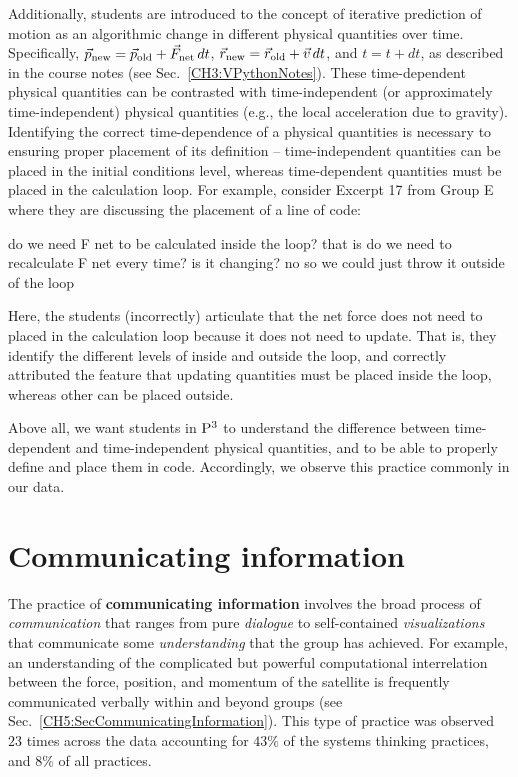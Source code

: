 \documentclass{msuphddissertation}
\begin{document}
\begin{doublespace}
\begin{appendices}
Additionally, students are introduced to the concept of iterative prediction of motion as an algorithmic change in different physical quantities over time.  Specifically, $\vec{p}_{\rm new} = \vec{p}_{\rm old} + \vec{F}_{\rm net}\,dt$, $\vec{r}_{\rm new} = \vec{r}_{\rm old} + \vec{v}\,dt$, and $t = t + dt$, as described in the course notes (see Sec.~\ref{CH3:VPythonNotes}).  These time-dependent physical quantities can be contrasted with time-independent (or approximately time-independent) physical quantities (e.g., the local acceleration due to gravity).  Identifying the correct time-dependence of a physical quantities is necessary to ensuring proper placement of its definition -- time-independent quantities can be placed in the initial conditions level, whereas time-dependent quantities must be placed in the calculation loop.  For example, consider Excerpt 17 from Group E where they are discussing the placement of a line of code:  \begin{description}
\SA do we need F net to be calculated inside the loop?
\SA that is do we need to recalculate F net every time? is it changing?
\SB no  
\SA so we could just throw it outside of the loop\end{description}  Here, the students (incorrectly) articulate that the net force does not need to placed in the calculation loop because it does not need to update.  That is, they identify the different levels of inside and outside the loop, and correctly attributed the feature that updating quantities must be placed inside the loop, whereas other can be placed outside.

Above all, we want students in ${\rm P}^{3}$ to understand the difference between time-dependent and time-independent physical quantities, and to be able to properly define and place them in code.  Accordingly, we observe this practice commonly in our data.

\section*{Communicating information}

The practice of \textbf{communicating information} involves the broad process of \textit{communication} that ranges from pure \textit{dialogue} to self-contained \textit{visualizations} that communicate some \textit{understanding} that the group has achieved.  For example, an understanding of the complicated but powerful computational interrelation between the force, position, and momentum of the satellite is frequently communicated verbally within and beyond groups (see Sec.~\ref{CH5:SecCommunicatingInformation}).  This type of practice was observed $23$ times across the data  accounting for $43\%$ of the systems thinking practices, and $8\%$ of all practices.


\end{appendices}
\end{doublespace}
\end{document}
